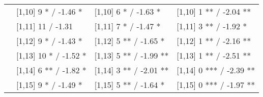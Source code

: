 \begin{table}
\begin{tabular}[t]{llll}
 & {}[1,10] 9 * / -1.46 * & {}[1,10] 6 * / -1.63 * & {}[1,10] 1 ** / -2.04 **\\
 & {}[1,11] 11  / -1.31 & {}[1,11] 7 * / -1.47 * & {}[1,11] 3 ** / -1.92 *\\
 & {}[1,12] 9 * / -1.43 * & {}[1,12] 5 ** / -1.65 * & {}[1,12] 1 ** / -2.16 **\\
\addlinespace
 & {}[1,13] 10 * / -1.52 * & {}[1,13] 5 ** / -1.99 ** & {}[1,13] 1 ** / -2.51 **\\
 & {}[1,14] 6 ** / -1.82 * & {}[1,14] 3 ** / -2.01 ** & {}[1,14] 0 *** / -2.39 **\\
 & {}[1,15] 9 * / -1.49 * & {}[1,15] 5 ** / -1.64 * & {}[1,15] 0 *** / -1.97 **\\
\bottomrule
\end{tabular}
\end{table}
